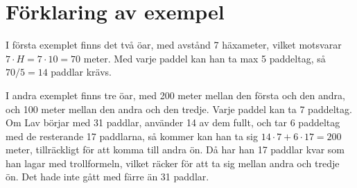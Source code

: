 \section*{Förklaring av exempel}

I första exemplet finns det två öar, med avstånd 7 häxameter, vilket motsvarar $7\cdot H = 7\cdot 10=70$ meter. Med varje paddel kan han ta max 5 paddeltag, så $70/5 = 14$ paddlar krävs.

I andra exemplet finns tre öar, med 200 meter mellan den första och den andra, och 100 meter mellan den andra och den tredje. Varje paddel kan ta 7 paddeltag. Om Lav börjar med 31 paddlar, använder 14 av dem fullt, och tar 6 paddeltag med de resterande 17 paddlarna, så kommer kan han ta sig $14\cdot 7+6\cdot 17=200$ meter, tillräckligt för att komma till andra ön. Då har han 17 paddlar kvar som han lagar med trollformeln, vilket räcker för att ta sig mellan andra och tredje ön. Det hade inte gått med färre än 31 paddlar.
